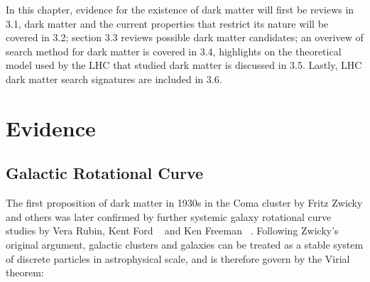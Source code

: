    In this chapter, evidence for the existence of dark matter will first be reviews in 3.1, dark matter and the current properties that restrict its nature will be covered in 3.2; section 3.3 reviews possible dark matter candidates; an overivew of search method for dark matter is covered in 3.4,  highlights on the theoretical model used by the LHC that studied dark matter is discussed in 3.5. Lastly, LHC dark matter search signatures are included in 3.6.

\section{Evidence}

\subsection{Galactic Rotational Curve}
    The first proposition of dark matter in 1930s in the Coma cluster by Fritz Zwicky and others was later confirmed by further systemic galaxy rotational curve studies by Vera Rubin, Kent Ford ~\cite{Rubin} and Ken Freeman ~\cite{freeman}.  
    Following Zwicky's original argument, galactic clusters and galaxies can be treated as a stable system of discrete particles in astrophysical scale, and is therefore govern by the Virial theorem:
%



